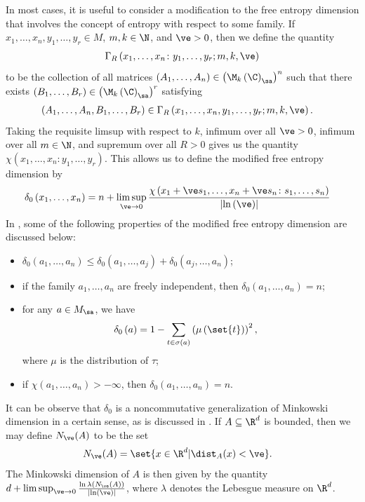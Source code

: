 \documentclass[10pt]{mypackage}
\begin{document}
In most cases, it is useful to consider a modification to the free entropy dimension that involves the concept of entropy with respect to some family. If $x_1,\dots,x_n,y_1,\dots,y_r\in M$, $m,k\in \N$, and $\ve > 0$, then we define the quantity
\begin{align*}
  \Gamma_R\left( x_1,\dots,x_n\colon y_1,\dots,y_r;m,k,\ve \right)
\end{align*}
to be the collection of all matrices $\left( A_1,\dots,A_n \right)\in \left( \M_k\left( \C \right)_{\sa} \right)^{n}$ such that there exists $\left( B_1,\dots,B_r \right)\in \left( \M_k\left( \C \right)_{\sa} \right)^{r}$ satisfying
\begin{align*}
  \left( A_1,\dots,A_n,B_1,\dots,B_r \right) &\in \Gamma_R\left( x_1,\dots,x_n,y_1,\dots,y_r;m,k,\ve \right).
\end{align*}
Taking the requisite limsup with respect to $k$, infimum over all $\ve > 0$, infimum over all $m\in \N$, and supremum over all $R > 0$ gives us the quantity $\chi\left( x_1,\dots,x_n\colon y_1,\dots,y_r \right)$. This allows us to define the modified free entropy dimension by
\begin{align*}
  \delta_0\left( x_1,\dots,x_n \right) &= n + \limsup_{\ve\rightarrow 0} \frac{\chi\left( x_1 + \ve s_1,\dots,x_n + \ve s_n \colon s_1,\dots,s_n \right)}{\left\vert \ln\left( \ve \right) \right\vert}
\end{align*}
In \cite{voiculescu_analogues_3}, some of the following properties of the modified free entropy dimension are discussed below:
\begin{itemize}
  \item $\delta_0\left( a_1,\dots,a_n \right) \leq \delta_0\left( a_1,\dots,a_j \right) + \delta_0\left( a_j,\dots,a_n \right)$;
  \item if the family $a_1,\dots,a_n$ are freely independent, then $\delta_0\left( a_1,\dots,a_n \right) = n$;
  \item for any $a\in M_{\sa}$, we have
    \begin{align*}
      \delta_0\left( a \right) &= 1-\sum_{t\in \sigma(a)} \left( \mu\left( \set{t} \right) \right)^2,
    \end{align*}
    where $\mu$ is the distribution of $\tau$;
  \item if $\chi\left( a_1,\dots,a_n \right) > -\infty$, then $\delta_0\left( a_1,\dots,a_n \right) = n$.
\end{itemize}
It can be observe that $\delta_0$ is a noncommutative generalization of Minkowski dimension in a certain sense, as is discussed in \cite{jung_free_entropy_dimension}. If $A\subseteq \R^{d}$ is bounded, then we may define $N_{\ve}(A)$ to be the set
\begin{align*}
  N_{\ve}(A) &= \set{x\in \R^{d} | \dist_{A}(x) < \ve}.
\end{align*}
The Minkowski dimension of $A$ is then given by the quantity $d + \limsup_{\ve\rightarrow 0}\frac{\ln\lambda\left( N_{\ve}(A) \right)}{\left\vert \ln\left( \ve \right) \right\vert}$, where $\lambda$ denotes the Lebesgue measure on $\R^{d}$.
\end{document}

